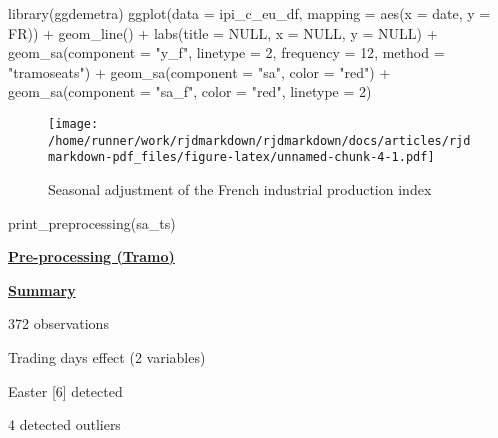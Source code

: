 \documentclass[
]{article}
\newenvironment{Shaded}{\begin{snugshade}}{\end{snugshade}}
\newcommand{\AttributeTok}[1]{\textcolor[rgb]{0.77,0.63,0.00}{#1}}
\newcommand{\ConstantTok}[1]{\textcolor[rgb]{0.00,0.00,0.00}{#1}}
\newcommand{\DecValTok}[1]{\textcolor[rgb]{0.00,0.00,0.81}{#1}}
\newcommand{\FunctionTok}[1]{\textcolor[rgb]{0.00,0.00,0.00}{#1}}
\newcommand{\NormalTok}[1]{#1}
\newcommand{\SpecialCharTok}[1]{\textcolor[rgb]{0.00,0.00,0.00}{#1}}
\newcommand{\StringTok}[1]{\textcolor[rgb]{0.31,0.60,0.02}{#1}}
\begin{document}
\begin{Shaded}
\begin{Highlighting}[]
\FunctionTok{library}\NormalTok{(ggdemetra)}
\FunctionTok{ggplot}\NormalTok{(}\AttributeTok{data =}\NormalTok{ ipi\_c\_eu\_df, }\AttributeTok{mapping =} \FunctionTok{aes}\NormalTok{(}\AttributeTok{x =}\NormalTok{ date, }\AttributeTok{y =}\NormalTok{ FR)) }\SpecialCharTok{+}
    \FunctionTok{geom\_line}\NormalTok{() }\SpecialCharTok{+}
    \FunctionTok{labs}\NormalTok{(}\AttributeTok{title =} \ConstantTok{NULL}\NormalTok{,}
         \AttributeTok{x =} \ConstantTok{NULL}\NormalTok{, }\AttributeTok{y =} \ConstantTok{NULL}\NormalTok{) }\SpecialCharTok{+}
    \FunctionTok{geom\_sa}\NormalTok{(}\AttributeTok{component =} \StringTok{"y\_f"}\NormalTok{, }\AttributeTok{linetype =} \DecValTok{2}\NormalTok{,}
            \AttributeTok{frequency =} \DecValTok{12}\NormalTok{, }\AttributeTok{method =} \StringTok{"tramoseats"}\NormalTok{) }\SpecialCharTok{+} 
    \FunctionTok{geom\_sa}\NormalTok{(}\AttributeTok{component =} \StringTok{"sa"}\NormalTok{, }\AttributeTok{color =} \StringTok{"red"}\NormalTok{) }\SpecialCharTok{+}
    \FunctionTok{geom\_sa}\NormalTok{(}\AttributeTok{component =} \StringTok{"sa\_f"}\NormalTok{, }\AttributeTok{color =} \StringTok{"red"}\NormalTok{, }\AttributeTok{linetype =} \DecValTok{2}\NormalTok{)}
\end{Highlighting}
\end{Shaded}

\begin{figure}
\centering
\texttt{[image: /home/runner/work/rjdmarkdown/rjdmarkdown/docs/articles/rjdmarkdown-pdf\_files/figure-latex/unnamed-chunk-4-1.pdf]}
\caption{Seasonal adjustment of the French industrial production index}
\end{figure}

\begin{Shaded}
\begin{Highlighting}[]
\FunctionTok{print\_preprocessing}\NormalTok{(sa\_ts)}
\end{Highlighting}
\end{Shaded}

\underline{\textbf{Pre-processing (Tramo)}}

\underline{\textbf{Summary}}

372 observations

Trading days effect (2 variables)

Easter {[}6{]} detected

4 detected outliers
\end{document}
